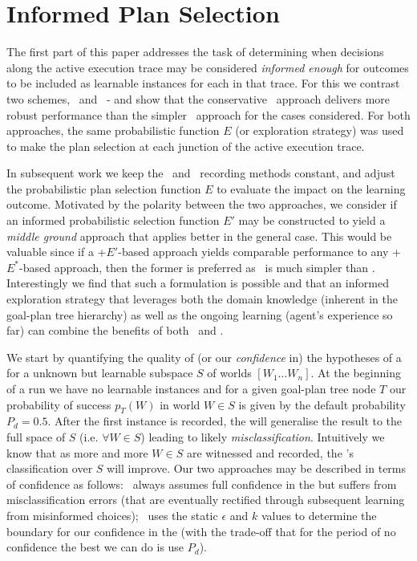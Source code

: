 \section{Informed Plan Selection}\label{sec:coverage}

The first part of this paper addresses the task of determining when decisions along the active execution trace may be considered \textit{informed enough} for outcomes to be included as learnable instances for each \dt in that trace. For this we contrast two schemes, \CL\ and \BUL\ - and show that the conservative \BUL\ approach delivers more robust performance than the simpler \CL\ approach for the cases considered. For both approaches, the same probabilistic function $E$ (or exploration strategy) was used to make the plan selection at each junction of the active execution trace.

In subsequent work we keep the \CL\ and \BUL\ recording methods constant, and adjust the probabilistic plan selection function $E$ to evaluate the impact on the learning outcome. Motivated by the polarity between the two approaches, we consider if an informed probabilistic selection function $E'$ may be constructed to yield a \textit{middle ground} approach that applies better in the general case. This would be valuable since if a \CL+$E'$-based approach yields comparable performance to any \BUL+$E^*$-based approach, then the former is preferred as \CL\ is much simpler than \BUL. Interestingly we find that such a formulation is possible and that an informed exploration strategy that leverages both the domain knowledge (inherent in the goal-plan tree hierarchy) as well as the ongoing learning (agent's experience so far) can combine the benefits of both \CL\ and \BUL.

We start by quantifying the quality of (or our \textit{confidence} in) the hypotheses of a \dt for a unknown but learnable subspace $S$ of worlds $[W_1 \ldots W_n]$. At the beginning of a run we have no learnable instances and for a given goal-plan tree node $T$ our probability of success $p_T(W)$ in world $W \in S$ is given by the default probability $P_d=0.5$. After the first instance is recorded, the \dt will generalise the result to the full space of $S$ (i.e. $\forall W \in S$) leading to likely \textit{misclassification}. Intuitively we know that as more and more $W \in S$ are witnessed and recorded, the \dt's classification over $S$ will improve. Our two approaches may be described in terms of confidence as follows: \CL\ always assumes full confidence in the \dt but suffers from misclassification errors (that are eventually rectified through subsequent learning from misinformed choices); \BUL\ uses the static $\epsilon$ and $k$ values to determine the boundary for our confidence in the \dt (with the trade-off that for the period of no confidence the best we can do is use $P_d$).

